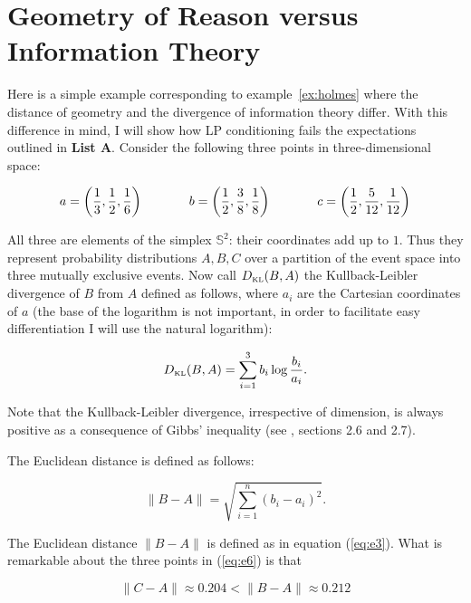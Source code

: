 \documentclass[smallextended]{svjour3}       %
\begin{document}
\section{Geometry of Reason versus Information Theory}
\label{grit}

Here is a simple example corresponding to example~\ref{ex:holmes}
where the distance of geometry and the divergence of information
theory differ. With this difference in mind, I will show how LP
conditioning fails the expectations outlined in \textbf{List A}.
Consider the following three points in three-dimensional space:

\begin{equation}
  \label{eq:e6}
    a=\left(\frac{1}{3},\frac{1}{2},\frac{1}{6}\right) \hspace{.5in}
    b=\left(\frac{1}{2},\frac{3}{8},\frac{1}{8}\right)  \hspace{.5in}
    c=\left(\frac{1}{2},\frac{5}{12},\frac{1}{12}\right)
\end{equation}

All three are elements of the simplex $\mathbb{S}^{2}$: their
coordinates add up to $1$. Thus they represent probability
distributions $A,B,C$ over a partition of the event space into three
mutually exclusive events. Now call $D_{\mbox{\tiny KL}}(B,A)$ the
Kullback-Leibler divergence of $B$ from $A$ defined as follows, where
$a_{i}$ are the Cartesian coordinates of $a$ (the base of the
logarithm is not important, in order to facilitate easy
differentiation I will use the natural logarithm):

\begin{equation}
  \label{eq:e7}
  D_{\mbox{\tiny KL}}(B,A)=\sum_{i=1}^{3}b_{i}\log\frac{b_{i}}{a_{i}}.
\end{equation}

Note that the Kullback-Leibler divergence, irrespective of dimension,
is always positive as a consequence of Gibbs' inequality (see
, sections 2.6 and 2.7).

The Euclidean distance is defined as follows:

\begin{equation}
  \label{eq:e3}
  \|B-A\|=\sqrt{\sum_{i=1}^{n}\left(b_{i}-a_{i}\right)^{2}}.
\end{equation}

The Euclidean distance $\|B-A\|$ is defined as in equation
(\ref{eq:e3}). What is remarkable about the three points in
(\ref{eq:e6}) is that

\begin{equation}
  \label{eq:e8}
  \|C-A\|\approx{}0.204<\|B-A\|\approx{}0.212
\end{equation}
\end{document}
